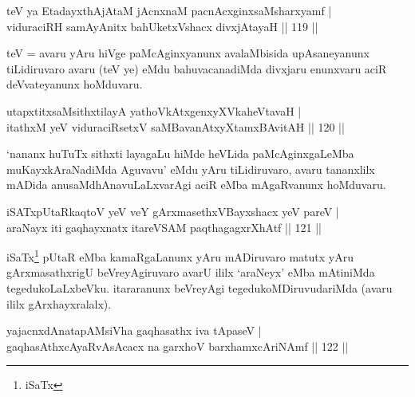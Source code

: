 


\begin{shl}
teV ya EtadayxthAjAtaM jAcnxnaM pacnAcxginxsaMsharxyamf | \\
viduraciRH samAyAnitx bahUketxVshacx divxjAtayaH \hfill|| 119 || 
\end{shl}

\begin{artha}
teV = avaru yAru hiVge paMcAginxyanunx avalaMbisida upAsaneyanunx
tiLidiruvaro avaru (teV ye) eMdu bahuvacanadiMda divxjaru enunxvaru
aciR deVvateyanunx hoMduvaru.
\end{artha}

\begin{shl}
utapxtitxsaMsithxtilayA yathoVkAtxgenxyXVkaheVtavaH | \\
itathxM yeV viduraciRsetxV saMBavanAtxyXtamxBAvitAH \hfill|| 120 || 
\end{shl}

\begin{artha}
`nananx huTuTx sithxti layagaLu hiMde heVLida paMcAginxgaLeMba
muKayxkAraNadiMda Aguvavu' eMdu yAru tiLidiruvaro, avaru tananxlilx
mADida anusaMdhAna\-vuLaLxvarAgi aciR eMba mAgaRvanunx hoMduvaru.
\end{artha}


\begin{shl}
iSATxpUtaRkaqtoV yeV veY gArxmasethxVBayxshacx yeV pareV | \\
araNayx iti gaqhayxnatx itareVSAM paqthagagxrXhAtf \hfill|| 121 || 
\end{shl}

\begin{artha}
iSaTx\footnote{iSaTx} pUtaR eMba kamaRgaLanunx yAru mADiruvaro
matutx yAru gArxmasathxrigU beVreyAgiruvaro avarU ililx `araNeyx' eMba
mAtiniMda tegedukoLaLxbeVku. itararanunx beVreyAgi
tegedukoMDiruvudariMda (avaru ililx gArxhayxralalx).
\end{artha}


\begin{shl}
yajacnxdAnatapAMsiVha gaqhasathx iva tApaseV | \\
gaqhasAthxcAyaRvAsAcacx na garxhoV barxhamxcAriNAmf \hfill|| 122 || 
\end{shl}

